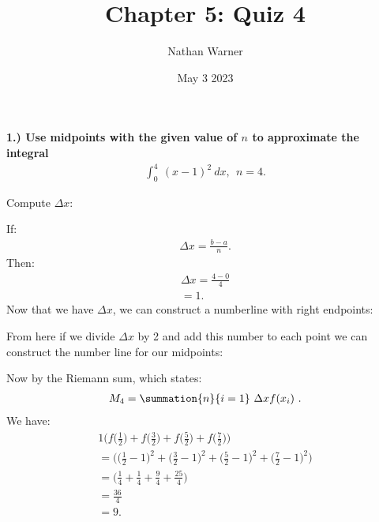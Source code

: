 \documentclass{report}
\title{\Huge{Chapter 5: Quiz 4}}
\author{\huge{Nathan Warner}}
\date{\huge{May 3 2023}}
\begin{document}
    \maketitle
    \bigbreak \noindent \bigbreak \noindent
    \begin{mdframed}
        \textbf{1.) Use midpoints with the given value of $n$ to approximate the integral}
        \begin{align*}
            \int_{0}^{4}\ (x-1)^{2}\ dx,\ \ n=4
        .\end{align*}
    \end{mdframed}
    \bigbreak \noindent \bigbreak \noindent
    Compute $\Delta x $:

    \bigbreak \noindent \bigbreak \noindent
    If:
    \begin{align*}
        \Delta x = \frac{b-a}{n}
    .\end{align*}
    Then:
\begin{align*}
        \Delta x = \frac{4-0}{4} \\
        = 1
    .\end{align*}
    \bigbreak \noindent \bigbreak \noindent
    Now that we have $\Delta x$, we can construct a numberline with right endpoints:
    \begin{figure}[ht]
        \centering
        \label{fig:nline}
    \end{figure}

    \bigbreak \noindent \bigbreak \noindent
    From here if we divide $\Delta x$ by 2 and add this number to each point we can construct the number line for our midpoints:
    \begin{figure}[ht]
        \centering
        \label{fig:nline2}
    \end{figure}
        
    \bigbreak \noindent 
    Now by the Riemann sum, which states:
    \begin{align*}
        M_{4} = \summation{n}{i=1}\ \Delta x f(x_{i})\ 
    .\end{align*}
    \bigbreak \noindent 
    We have:
    \begin{align*}
        1\bigg(f\bigg(\frac{1}{2}\bigg) + f\bigg(\frac{3}{2}\bigg) + f\bigg(\frac{5}{2}\bigg) + f\bigg(\frac{7}{2}\bigg)\bigg) \\
        = \bigg(\bigg(\frac{1}{2}-1\bigg)^{2} + \bigg(\frac{3}{2} -1\bigg)^{2} + \bigg(\frac{5}{2}-1\bigg)^{2} + \bigg(\frac{7}{2}-1\bigg)^{2}\bigg) \\ 
        = \bigg(\frac{1}{4} + \frac{1}{4} +\frac{9}{4} + \frac{25}{4}\bigg) \\
        =\frac{36}{4} \\
        \boxed{=9}
    .\end{align*}
\end{document}
